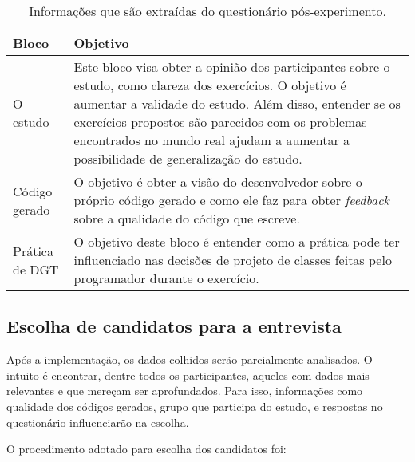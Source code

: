 \begin{table}
	\begin{tabular}{ | p{5cm} | p{5cm} |}
		
		\hline
		
		Bloco & Objetivo \\
		
		\hline
		
		O estudo &
		Este bloco visa obter a opinião dos participantes sobre o estudo, como clareza dos
		exercícios. O objetivo é aumentar a validade do estudo.
		Além disso, entender se os exercícios propostos são parecidos com os problemas encontrados no mundo
		real ajudam a aumentar a possibilidade de generalização do estudo.
		\\ \hline
		
		Código gerado &
		O objetivo é obter a visão do desenvolvedor sobre o próprio código gerado e como ele
		faz para obter \textit{feedback} sobre a qualidade do código que escreve.
		\\ \hline
		
		Prática de DGT &
		O objetivo deste bloco é entender como a prática pode ter influenciado
		nas decisões de projeto de classes feitas pelo programador durante o exercício.\\
		
		\hline
		
	\end{tabular}
	\label{tab:questionario-pos}
	\caption{Informações que são extraídas do questionário pós-experimento.}
\end{table}

\subsection{Escolha de candidatos para a entrevista}

Após a implementação, os dados colhidos serão parcialmente analisados. O intuito
é encontrar, dentre todos os participantes, aqueles com dados mais relevantes
e que mereçam ser aprofundados.
Para isso, informações como qualidade dos códigos gerados, grupo que participa
do estudo, e respostas no questionário influenciarão na escolha.

O procedimento adotado para escolha dos candidatos foi:

